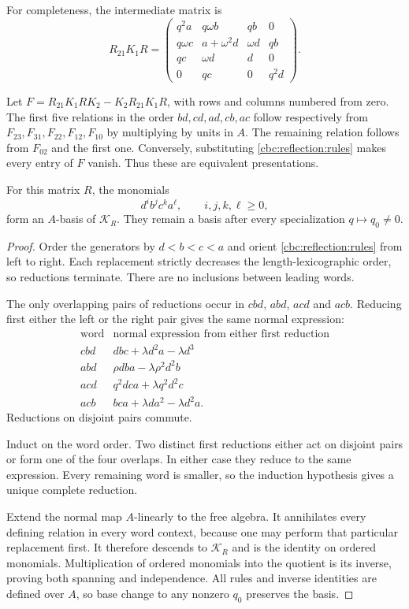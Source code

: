 For completeness, the intermediate matrix is
\[
 R_{21}K_1R=
 \begin{pmatrix}
 q^2a&q\omega b&qb&0\\
 q\omega c&a+\omega^2d&\omega d&qb\\
 qc&\omega d&d&0\\
 0&qc&0&q^2d
 \end{pmatrix}.
\]

Let $F=R_{21}K_1RK_2-K_2R_{21}K_1R$, with rows and columns numbered
from zero.  The first five relations in the order
$bd,cd,ad,cb,ac$ follow respectively from
$F_{23},F_{31},F_{22},F_{12},F_{10}$ by multiplying by units in $A$.
The remaining relation follows from $F_{02}$ and the first one.
Conversely, substituting \eqref{cbc:reflection:rules} makes every entry
of $F$ vanish.  Thus these are equivalent presentations.

\begin{theorem}\label{cbc:reflection:pbw}
For this matrix $R$, the monomials
\[
 d^i b^j c^k a^\ell,\qquad i,j,k,\ell\geq0,
\]
form an $A$-basis of $\mathcal K_R$.
They remain a basis after every specialization $q\mapsto q_0\ne0$.
\end{theorem}
\begin{proof}
Order the generators by $d<b<c<a$ and orient
\eqref{cbc:reflection:rules} from left to right.
Each replacement strictly decreases the length-lexicographic order, so
reductions terminate.  There are no inclusions between leading words.

The only overlapping pairs of reductions occur in $cbd$, $abd$, $acd$
and $acb$.  Reducing first either the left or the right pair gives the
same normal expression:
\[
 \begin{array}{c|l}
 \text{word}&\text{normal expression from either first reduction}\\\hline
 cbd&dbc+\lambda d^2a-\lambda d^3\\
 abd&\rho dba-\lambda\rho^2d^2b\\
 acd&q^2dca+\lambda q^2d^2c\\
 acb&bca+\lambda da^2-\lambda d^2a.
 \end{array}
\]
Reductions on disjoint pairs commute.

Induct on the word order.  Two distinct first reductions either act on
disjoint pairs or form one of the four overlaps.  In either case they reduce
to the same expression.  Every remaining word is smaller, so the induction
hypothesis gives a unique complete reduction.

Extend the normal map $A$-linearly to the free algebra.
It annihilates every defining relation in every word context, because one
may perform that particular replacement first.
It therefore descends to $\mathcal K_R$ and is the identity on ordered
monomials.  Multiplication of ordered monomials into the quotient is its
inverse, proving both spanning and independence.
All rules and inverse identities are defined over $A$, so base change to
any nonzero $q_0$ preserves the basis.
\end{proof}

